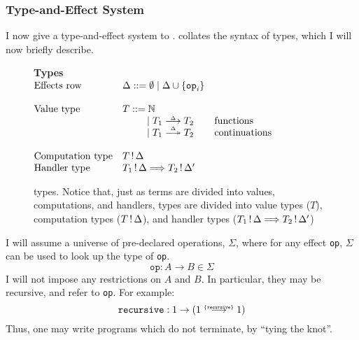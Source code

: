 \subsubsection{Type-and-Effect System}
I now give a type-and-effect system to \efflang{}.  collates the syntax of \efflang{} types, which I will now briefly describe. 

\begin{figure}
  \begin{eff-desc}
  {\large \textbf{Types}}\\

  $\begin{array}{@{}lllr}
    \text{Effects row} & \Delta ::= \emptyset \mid \Delta \cup \{ \texttt{op}_i \} \\ \\
    \text{Value type} & T ::= \mathbb{N} & \\
                              &\quad\quad\,\,\, \mid \functionType{T_1}{T_2} & \text{functions}\\
                              &\quad\quad\,\,\, \mid \continuationType{T_1}{T_2} & \text{continuations}\\ \\
    \text{Computation type} & \effectType{T} \\
    \text{Handler type} & \handlerType{\effectType{T_1}}{\effectType[\Delta']{T_2}}
  \end{array}$
  \end{eff-desc}
  \caption{\efflang{} types. Notice that, just as terms are divided into values, computations, and handlers, types are divided into value types ($T$), computation types ($\effectType{T}$), and handler types ($\handlerType{\effectType{T_1}}{\effectType[\Delta']{T_2}}$)}
  \label{fig:efflang-type-syntax}
\end{figure}

I will assume a universe of pre-declared operations, $\Sigma$, where for any effect \texttt{op}, $\Sigma$ can be used to look up the type of \texttt{op}.
\[\texttt{op}: A \to B \in \Sigma \]
I will not impose any restrictions on $A$ and $B$. In particular, they may be recursive, and refer to \texttt{op}. For example:
\[\texttt{recursive}: 1 \to (\functionType[\{ \texttt{recursive} \}]{1}{1})\]
Thus, one may write programs which do not terminate, by ``tying the knot''. 

